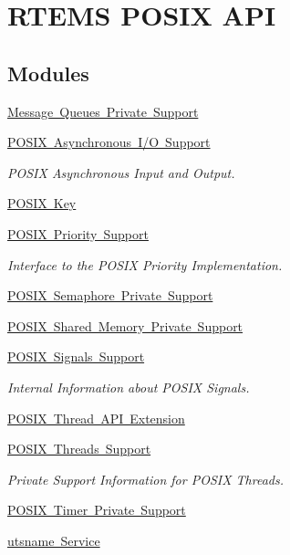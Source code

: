 \hypertarget{group__POSIXAPI}{}\section{R\+T\+E\+MS P\+O\+S\+IX A\+PI}
\label{group__POSIXAPI}
\subsection*{Modules}
\begin{DoxyCompactItemize}
\item 
\mbox{\hyperlink{group__POSIX__MQUEUE__P}{Message Queues Private Support}}
\item 
\mbox{\hyperlink{group__POSIX__AIO}{P\+O\+S\+I\+X Asynchronous I/\+O Support}}
\begin{DoxyCompactList}\small\item\em P\+O\+S\+IX Asynchronous Input and Output. \end{DoxyCompactList}\item 
\mbox{\hyperlink{group__POSIX__KEY}{P\+O\+S\+I\+X Key}}
\item 
\mbox{\hyperlink{group__POSIX__PRIORITY}{P\+O\+S\+I\+X Priority Support}}
\begin{DoxyCompactList}\small\item\em Interface to the P\+O\+S\+IX Priority Implementation. \end{DoxyCompactList}\item 
\mbox{\hyperlink{group__POSIXSemaphorePrivate}{P\+O\+S\+I\+X Semaphore Private Support}}
\item 
\mbox{\hyperlink{group__POSIXShmPrivate}{P\+O\+S\+I\+X Shared Memory Private Support}}
\item 
\mbox{\hyperlink{group__POSIX__SIGNALS}{P\+O\+S\+I\+X Signals Support}}
\begin{DoxyCompactList}\small\item\em Internal Information about P\+O\+S\+IX Signals. \end{DoxyCompactList}\item 
\mbox{\hyperlink{group__POSIX__THREAD}{P\+O\+S\+I\+X Thread A\+P\+I Extension}}
\item 
\mbox{\hyperlink{group__POSIX__PTHREAD}{P\+O\+S\+I\+X Threads Support}}
\begin{DoxyCompactList}\small\item\em Private Support Information for P\+O\+S\+IX Threads. \end{DoxyCompactList}\item 
\mbox{\hyperlink{group__POSIX__INTERNAL__TIMERS}{P\+O\+S\+I\+X Timer Private Support}}
\item 
\mbox{\hyperlink{group__UTSNAME}{utsname Service}}
\end{DoxyCompactItemize}

